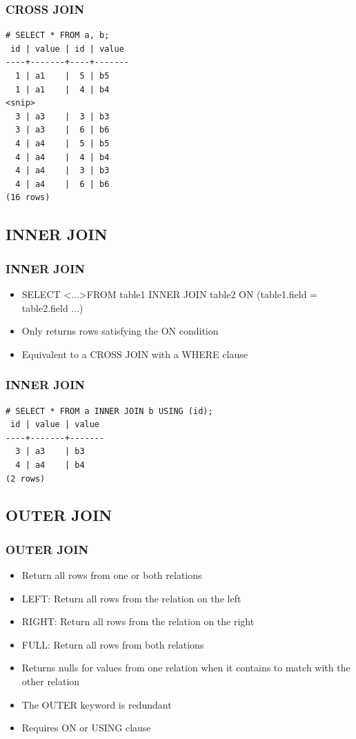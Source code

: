 \documentclass{beamer}
\begin{document}
\begin{frame}[fragile]
    \frametitle{CROSS JOIN}
    \begin{verbatim}
# SELECT * FROM a, b;
 id | value | id | value
----+-------+----+-------
  1 | a1    |  5 | b5
  1 | a1    |  4 | b4
<snip>
  3 | a3    |  3 | b3
  3 | a3    |  6 | b6
  4 | a4    |  5 | b5
  4 | a4    |  4 | b4
  4 | a4    |  3 | b3
  4 | a4    |  6 | b6
(16 rows)
    \end{verbatim}
\end{frame}

\subsection{INNER JOIN}
\begin{frame}
    \frametitle{INNER JOIN}
    \begin{itemize}
        \item SELECT \textless ...\textgreater FROM table1 INNER JOIN table2 ON (table1.field = table2.field ...)
        \pause
        \item Only returns rows satisfying the ON condition
        \pause
        \item Equivalent to a CROSS JOIN with a WHERE clause
    \end{itemize}
\end{frame}

\begin{frame}[fragile]
    \frametitle{INNER JOIN}
    \begin{verbatim}
# SELECT * FROM a INNER JOIN b USING (id);
 id | value | value
----+-------+-------
  3 | a3    | b3
  4 | a4    | b4
(2 rows)
    \end{verbatim}
\end{frame}

\subsection{OUTER JOIN}
\begin{frame}
    \frametitle{OUTER JOIN}
    \begin{itemize}
        \item Return all rows from one or both relations
        \pause
        \item LEFT: Return all rows from the relation on the left
        \pause
        \item RIGHT: Return all rows from the relation on the right
        \pause
        \item FULL: Return all rows from both relations
        \pause
        \item Returns nulls for values from one relation when it contains to match with the other relation
        \pause
        \item The OUTER keyword is redundant
        \pause
        \item Requires ON or USING clause
    \end{itemize}
\end{frame}
\end{document}
